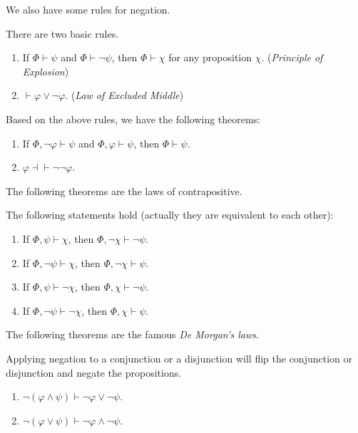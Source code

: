 We also have some rules for negation.

\begin{definition}
    There are two basic rules. 
    \begin{enumerate}[itemindent=0ex, itemsep=0pt, label=\upshape{(\alph*)}]
        \item If $\Phi\vdash\psi$ and $\Phi\vdash\neg\psi$, then $\Phi\vdash\chi$ for any proposition $\chi$. (\emph{Principle of Explosion})
        \item $\vdash\varphi\vee\neg\varphi$. (\emph{Law of Excluded Middle})
    \end{enumerate}
\end{definition}

\begin{theorem}
    Based on the above rules, we have the following theorems:
    \begin{enumerate}[itemindent=0ex, itemsep=0pt, label=\upshape{(\alph*)}]
        \item If $\Phi,\neg\varphi\vdash\psi$ and $\Phi,\varphi\vdash\psi$, then $\Phi\vdash\psi$.
        \item $\varphi\dashv\vdash\neg\neg\varphi$.
    \end{enumerate}
\end{theorem}

The following theorems are the laws of contrapositive. 

\begin{theorem}
    The following statements hold (actually they are equivalent to each other):
    \begin{enumerate}[itemindent=0ex, itemsep=0pt, label=\upshape{(\alph*)}]
        \item If $\Phi,\psi\vdash\chi$, then $\Phi,\neg\chi\vdash\neg\psi$.
        \item If $\Phi,\neg\psi\vdash\chi$, then $\Phi,\neg\chi\vdash\psi$.
        \item If $\Phi,\psi\vdash\neg\chi$, then $\Phi,\chi\vdash\neg\psi$.
        \item If $\Phi,\neg\psi\vdash\neg\chi$, then $\Phi,\chi\vdash\psi$.
    \end{enumerate}
\end{theorem}

The following theorems are the famous \emph{De Morgan's laws}.

\begin{theorem}
    Applying negation to a conjunction or a disjunction will flip the conjunction or disjunction and negate the propositions. 
    \begin{enumerate}[itemindent=0ex, itemsep=0pt, label=\upshape{(\alph*)}]
        \item $\neg(\varphi\wedge\psi)\vdash\neg\varphi\vee\neg\psi$.
        \item $\neg(\varphi\vee\psi)\vdash\neg\varphi\wedge\neg\psi$.
    \end{enumerate}
\end{theorem}